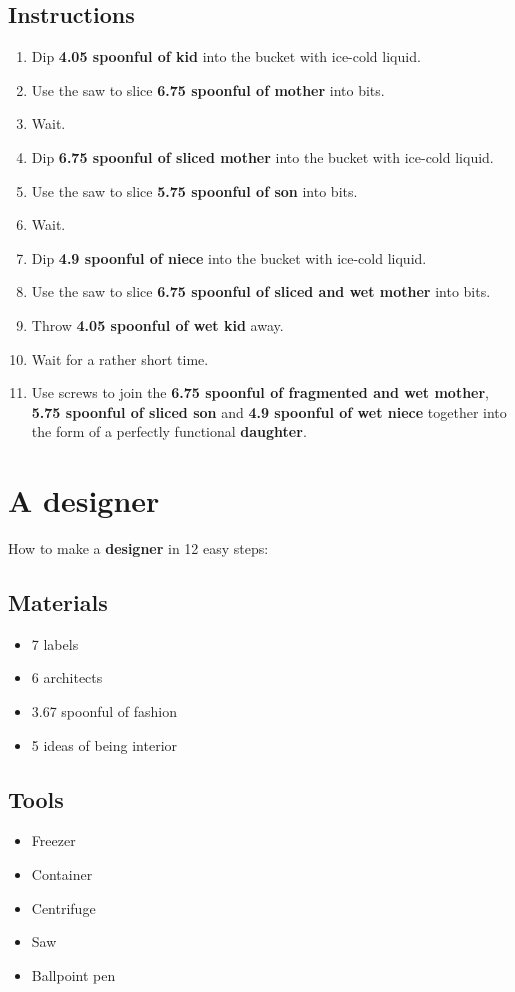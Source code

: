 \documentclass{article}
\begin{document}
\subsection{Instructions}\begin{enumerate}
\item 
Dip \textbf{4.05 spoonful of kid} into the bucket with ice-cold liquid.
\item 
Use the saw to slice \textbf{6.75 spoonful of mother} into bits.
\item 
Wait.
\item 
Dip \textbf{6.75 spoonful of sliced mother} into the bucket with ice-cold liquid.
\item 
Use the saw to slice \textbf{5.75 spoonful of son} into bits.
\item 
Wait.
\item 
Dip \textbf{4.9 spoonful of niece} into the bucket with ice-cold liquid.
\item 
Use the saw to slice \textbf{6.75 spoonful of sliced and wet mother} into bits.
\item 
Throw \textbf{4.05 spoonful of wet kid} away.
\item 
Wait for a rather short time.
\item 
Use screws to join the \textbf{6.75 spoonful of fragmented and wet mother}, \textbf{5.75 spoonful of sliced son} and \textbf{4.9 spoonful of wet niece} together into the form of a perfectly functional \textbf{daughter}.
\end{enumerate}
\newpage
\section{A designer}How to make a \textbf{designer} in 12 easy steps:

\subsection{Materials}\begin{itemize}
\item 
7 labels
\item 
6 architects
\item 
3.67 spoonful of fashion
\item 
5 ideas of being interior
\end{itemize}
\subsection{Tools}\begin{itemize}
\item 
Freezer
\item 
Container
\item 
Centrifuge
\item 
Saw
\item 
Ballpoint pen
\end{itemize}
\end{document}
